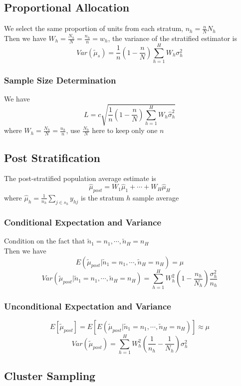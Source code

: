 \documentclass[11pt]{article}
\newcommand{\ds}{\displaystyle}
\begin{document}
\subsection{Proportional Allocation}
We select the same proportion of units from each stratum, $n_h=\ds\frac{n}{N}N_h$ \\
Then we have $W_h=\frac{N_h}{N}=\frac{n_h}{n}=w_h$, the variance of the stratified estimator is 
\[Var(\tilde{\mu}_s)=\frac{1}{n}(1-\frac{n}{N})\sum_{h=1}^{H}W_h\sigma^2_h\]
\subsubsection{Sample Size Determination}
We have \[L=c\sqrt{\frac{1}{n}(1-\frac{n}{N})\sum_{h=1}^{H}W_h\hat{\sigma}^2_h}\]
where $W_h=\frac{N_h}{N} = \frac{n_h}{n}$, use $\frac{N_h}{N}$ here to keep only one $n$  
\subsection{Post Stratification}
The post-stratified population average estimate is 
\[\hat{\mu}_{post} = W_1\hat{\mu}_1+\cdots+W_H\hat{\mu}_H\]
where $\hat\mu_h = \frac{1}{n_h}\sum_{j\in s_h}y_{hj}$ is the stratum $h$ sample average 
\subsubsection{Conditional Expectation and Variance}
Condition on the fact that $\tilde{n}_1=n_1, \cdots, \tilde{n}_H=n_H$ \\
Then we have 
\[E(\tilde{\mu}_{post}|\tilde{n}_1=n_1, \cdots, \tilde{n}_H=n_H) = \mu\]
\[Var(\tilde{\mu}_{post}|\tilde{n}_1=n_1, \cdots, \tilde{n}_H=n_H) = \sum_{h=1}^{H}W_h^2(1-\frac{n_h}{N_h})\frac{\sigma^2_h}{n_h}\]
\subsubsection{Unconditional Expectation and Variance}
\[E[\tilde{\mu}_{post}] = E[E(\tilde{\mu}_{post}|\tilde{n}_1=n_1, \cdots, \tilde{n}_H=n_H)]\approx \mu\]
\[Var(\tilde{\mu}_{post}) = \sum_{h=1}^{H}W_h^2(\frac{1}{n_h}-\frac{1}{N_h})\sigma^2_h\]
\subsection{Cluster Sampling}
\end{document}

